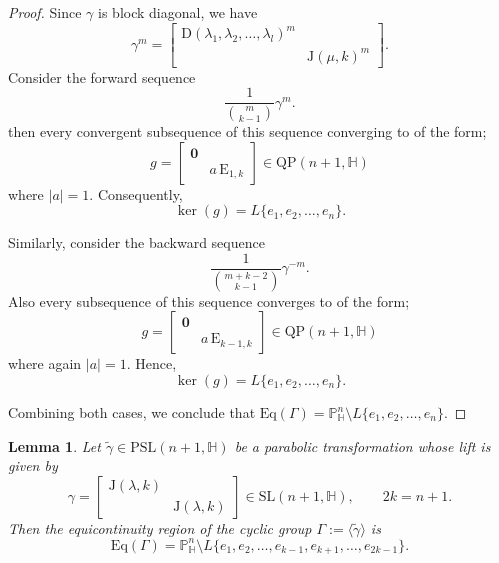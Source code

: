 \documentclass[12pt,reqno]{amsart}
\numberwithin{equation}{section}
\newtheorem{lemma}[theorem]{Lemma}
\theoremstyle{definition}
\def\H{\mathbb H}
\def\P{\mathbb P}
\def\H{\mathbb {H}}
\begin{document}
\begin{proof}
Since $\gamma$ is block diagonal, we have
\[
\gamma^m =
\begin{bmatrix}
    \mathrm{D}(\lambda_1, \lambda_2, \ldots, \lambda_l)^m & \\
    & \mathrm{J}(\mu, k)^m
\end{bmatrix}.
\]
Consider the forward sequence
\[
\frac{1}{{m \choose k-1}} \gamma^m.
\]
 then every convergent subsequence of this sequence converging to of the form;
\[
g =
\begin{bmatrix}
    \mathbf{0} & \\
    & a\,\mathrm{E}_{1,k}
\end{bmatrix}  \in \mathrm{QP}(n+1,\mathbb{H})
\]
where $|a| = 1$. Consequently,
\[
\ker(g) = L\{ e_1, e_2, \ldots, e_n \}.
\]

Similarly, consider the backward sequence
\[
\frac{1}{{m + k - 2 \choose k - 1}} \gamma^{-m}.
\]
Also every subsequence of this sequence converges to of the form;
\[
g =
\begin{bmatrix}
    \mathbf{0} & \\
    & a\,\mathrm{E}_{k-1,k}
\end{bmatrix} \in \mathrm{QP}(n+1,\mathbb{H})
\]
where again $|a| = 1$. Hence,
\[
\ker(g) = L\{ e_1, e_2, \ldots, e_n \}.
\]

Combining both cases, we conclude that
$\mathrm{Eq}(\Gamma) = \P^n_\H\setminus L\{ e_1, e_2, \ldots, e_n \}$. 
\end{proof}

\begin{lemma}
\label{th:par3}
Let $\tilde{\gamma} \in \mathrm{PSL}(n+1, \mathbb{H})$ be a parabolic transformation whose lift is given by 
\[
\gamma =
\begin{bmatrix}
    \mathrm{J}(\lambda, k) & \\
    & \mathrm{J}(\lambda, k)
\end{bmatrix}
\in \mathrm{SL}(n+1, \mathbb{H}), \qquad 2k = n + 1.
\]
Then the equicontinuity region of the cyclic group $\Gamma := \langle \tilde{\gamma} \rangle$ is 
\[
\mathrm{Eq}(\Gamma) = \P^n_\H\setminus L\{ e_1, e_2, \ldots, e_{k-1}, e_{k+1}, \ldots, e_{2k-1} \}.
\]
\end{lemma}
\end{document}
